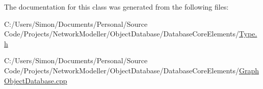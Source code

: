The documentation for this class was generated from the following files\+:\begin{DoxyCompactItemize}
\item 
C\+:/\+Users/\+Simon/\+Documents/\+Personal/\+Source Code/\+Projects/\+Network\+Modeller/\+Object\+Database/\+Database\+Core\+Elements/\hyperlink{_type_8h}{Type.\+h}\item 
C\+:/\+Users/\+Simon/\+Documents/\+Personal/\+Source Code/\+Projects/\+Network\+Modeller/\+Object\+Database/\+Database\+Core\+Elements/\hyperlink{_graph_object_database_8cpp}{Graph\+Object\+Database.\+cpp}\end{DoxyCompactItemize}

